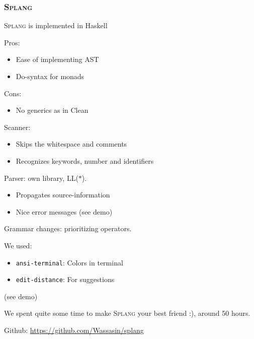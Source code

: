 \documentclass[14pt]{beamer}
\title{\splang}
\author{Wouter Geraedts \and Joshua Moerman}
\institute{Radboud Universiteit Nijmegen}
\date{}
\newcommand{\splang}{\textsc{Splang}\xspace}
\begin{document}
\begin{frame}
\titlepage
\end{frame}


\begin{frame}
\frametitle{\splang}
\splang is implemented in Haskell
\bigskip

Pros:
\begin{itemize}
	\item Ease of implementing AST
	\item Do-syntax for monads
\end{itemize}

Cons:
\begin{itemize}
	\item No generics as in Clean
\end{itemize}
\end{frame}


\begin{frame}
Scanner:
\begin{itemize}
	\item Skips the whitespace and comments
	\item Recognizes keywords, number and identifiers
\end{itemize}
\bigskip

Parser: own library, LL($\ast$).
\begin{itemize}
	\item Propagates source-information
	\item Nice error messages (see demo)
\end{itemize}
\bigskip

Grammar changes: prioritizing operators.
\end{frame}


\begin{frame}
We used:
\begin{itemize}
	\item \texttt{ansi-terminal}: Colors in terminal
	\item \texttt{edit-distance}: For suggestions
\end{itemize}
(see demo)
\bigskip

We spent quite some time to make \splang your best friend :), around 50 hours.
\bigskip

Github: \url{https://github.com/Wassasin/splang}
\end{frame}
\end{document}
